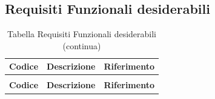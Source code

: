\documentclass[a4paper,12pt]{article}
\begin{document}
\subsection{Requisiti Funzionali desiderabili} \label{subsection:requisiti_funzionali_desiderabili}
\begin{center}
\renewcommand{\arraystretch}{1.5}
\begin{longtable}{|c|p{8.5cm}|>{\centering\arraybackslash}p{4cm}|}

\hline
\rowcolor{gray!60}
\textbf{Codice} & \textbf{Descrizione} & \textbf{Riferimento} \\
\hline
\endfirsthead
\caption[]{Tabella Requisiti Funzionali desiderabili (continua)} \\
\hline
\rowcolor{gray!60}
\textbf{Codice} & \textbf{Descrizione} & \textbf{Riferimento} \\
\hline
\endhead


\end{longtable}
\end{center}
\end{document}
